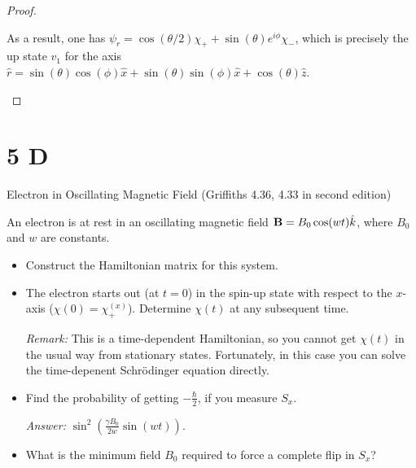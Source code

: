 \documentclass{article}
\begin{document}
\begin{proof}
\begin{itemize}
\begin{itemize}
            As a result, one has $\psi_r = \cos(\theta/2)\chi_+ + \sin(\theta)e^{i\phi}\chi_-$, which is precisely the up state $v_1$ for the axis $\hat{r} = \sin(\theta)\cos(\phi)\hat{x}+\sin(\theta)\sin(\phi)\hat{x}+\cos(\theta)\hat{z}$.
        \end{itemize}
    \end{itemize}
\end{proof}

\newpage

\section*{5 D}
\begin{ques}\label{q5}
Electron in Oscillating Magnetic Field (Griffiths 4.36, 4.33 in second edition)

\hfil

An electron is at rest in an oscillating magnetic field $\mathbf{B} = B_0 \cos(wt)\hat{k}$, where $B_0$ and $w$ are constants.
\begin{itemize}
    \item[(a)] Construct the Hamiltonian matrix for this system.
    \item[(b)] The electron starts out (at $t=0$) in the spin-up state with respect to the $x$-axis ($\chi(0)=\chi_+^{(x)}$). Determine $\chi(t)$ at any subsequent time. 
    
    \emph{Remark:} This is a time-dependent Hamiltonian, so you cannot get $\chi(t)$ in the usual way from stationary states. Fortunately, in this case you can solve the time-depenent Schr\"odinger equation directly.
    \item[(c)] Find the probability of getting $-\frac{\hbar}{2}$, if you measure $S_x$.
    
    \emph{Answer:} $\sin^2\left(\frac{\gamma B_0}{2w}\sin(wt)\right)$.

    \item[(d)] What is the minimum field $B_0$ required to force a complete flip in $S_x$?
\end{itemize}
\end{ques}
\end{document}
